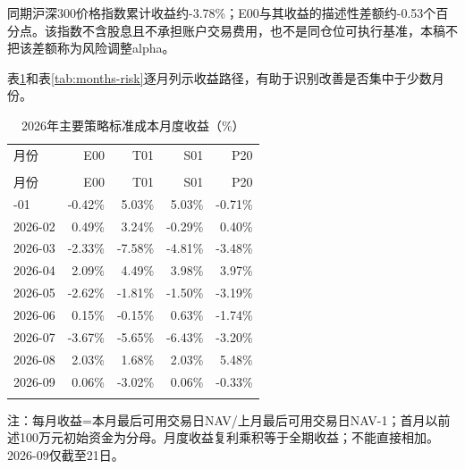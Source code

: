 \documentclass[12pt]{article}
\newcommand{\toprule}{\noalign{\hrule height .8pt}}
\newcommand{\midrule}{\noalign{\hrule height .4pt}}
\newcommand{\bottomrule}{\noalign{\hrule height .8pt}}
\begin{document}
同期沪深300价格指数累计收益约-3.78\%；E00与其收益的描述性差额约-0.53个百分点。该指数不含股息且不承担账户交易费用，也不是同仓位可执行基准，本稿不把该差额称为风险调整alpha。

表\ref{tab:months}和表\ref{tab:months-risk}逐月列示收益路径，有助于识别改善是否集中于少数月份。


{\small
\begin{longtable}{@{}lrrrr@{}}
\caption{2026年主要策略标准成本月度收益（\%）}\label{tab:months}\\
\toprule
月份 & E00 & T01 & S01 & P20 \\
\midrule\endfirsthead
\multicolumn{5}{c}{表\thetable（续）}\\\toprule
月份 & E00 & T01 & S01 & P20 \\
\midrule\endhead
2026-01 & -0.42\% & 5.03\% & 5.03\% & -0.71\% \\
2026-02 & 0.49\% & 3.24\% & -0.29\% & 0.40\% \\
2026-03 & -2.33\% & -7.58\% & -4.81\% & -3.48\% \\
2026-04 & 2.09\% & 4.49\% & 3.98\% & 3.97\% \\
2026-05 & -2.62\% & -1.81\% & -1.50\% & -3.19\% \\
2026-06 & 0.15\% & -0.15\% & 0.63\% & -1.74\% \\
2026-07 & -3.67\% & -5.65\% & -6.43\% & -3.20\% \\
2026-08 & 2.03\% & 1.68\% & 2.03\% & 5.48\% \\
2026-09 & 0.06\% & -3.02\% & 0.06\% & -0.33\% \\
\bottomrule\end{longtable}}
{\footnotesize\noindent 注：每月收益=本月最后可用交易日NAV/上月最后可用交易日NAV-1；首月以前述100万元初始资金为分母。月度收益复利乘积等于全期收益；不能直接相加。2026-09仅截至21日。\par}
\end{document}
